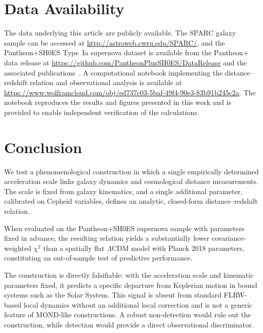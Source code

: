 \documentclass[fleqn,usenatbib]{mnras}
\begin{document}
\section*{Data Availability}

The data underlying this article are publicly available. The SPARC galaxy sample can be accessed at \url{http://astroweb.cwru.edu/SPARC/}, and the Pantheon+SH0ES Type~Ia supernova dataset is available from the Pantheon+ data release at \url{https://github.com/PantheonPlusSH0ES/DataRelease} and the associated publications~\cite{Brout2022,Riess2022}. A computational notebook implementing the distance--redshift relation and observational analysis is available at \url{https://www.wolframcloud.com/obj/ed737c03-5baf-49f4-90e3-83b91b245c2a}. The notebook reproduces the results and figures presented in this work and is provided to enable independent verification of the calculations.

\section{Conclusion}

We test a phenomenological construction in which a single empirically determined acceleration scale links galaxy dynamics and cosmological distance measurements. The scale is fixed from galaxy kinematics, and a single additional parameter, calibrated on Cepheid variables, defines an analytic, closed-form distance--redshift relation.

When evaluated on the Pantheon+SH0ES supernova sample with parameters fixed in advance, the resulting relation yields a substantially lower covariance-weighted $\chi^2$ than a spatially flat $\Lambda$CDM model with Planck 2018 parameters, constituting an out-of-sample test of predictive performance.

The construction is directly falsifiable: with the acceleration scale and kinematic parameters fixed, it predicts a specific departure from Keplerian motion in bound systems such as the Solar System. This signal is absent from standard FLRW-based local dynamics without an additional local correction and is not a generic feature of MOND-like constructions. A robust non-detection would rule out the construction, while detection would provide a direct observational discriminator.



\label{lastpage}
\end{document}
